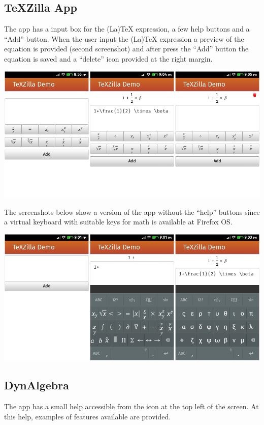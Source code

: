 \subsection{TeXZilla App}

The app has a input box for the (La)TeX expression, a few help buttons and a
``Add'' button. When the user input the (La)TeX expression a preview of the
equation is provided (second screenshot) and after press the ``Add'' button the
equation is saved and a ``delete'' icon provided at the right margin.

\href{http://r-gaia-cs.github.io/TeXZilla-webapp/}{\includegraphics[width=\textwidth]{screenshots/9-texzilla-app-A.png}}

The screenshots below show a version of the app without the ``help'' buttons
since a virtual keyboard with suitable keys for math is available at Firefox OS.

\href{http://r-gaia-cs.github.io/TeXZilla-webapp/}{\includegraphics[width=\textwidth]{screenshots/9-texzilla-app-B.png}}

\subsection{DynAlgebra}

The app has a small help accessible from the icon at the top left of the screen.
At this help, examples of features available are provided.

